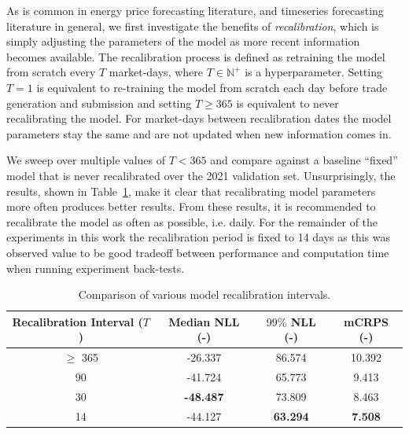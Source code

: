 As is common in energy price forecasting literature, and timeseries forecasting literature in general, we first
investigate the benefits of \textit{recalibration}, which is simply adjusting the parameters of the model as more
recent information becomes available.
The recalibration process is defined as retraining the model from scratch every $T$ market-days, where
$T \in \mathbb{N}^+$ is a hyperparameter.
Setting $T=1$ is equivalent to re-training the model from scratch each day before trade generation and submission and
setting $T \geq 365$ is equivalent to never recalibrating the model.
For market-days between recalibration dates the model parameters stay the same and are not updated when new information
comes in.

We sweep over multiple values of $T < 365$ and compare against a baseline ``fixed'' model that is never recalibrated
over the 2021 validation set.
Unsurprisingly, the results, shown in Table~\ref{tab:recalibration}, make it clear that recalibrating model parameters
more often produces better results.
From these results, it is recommended to recalibrate the model as often as possible, i.e. daily.
For the remainder of the experiments in this work the recalibration period is fixed to 14 days as this was observed
value to be good tradeoff between performance and computation time when running experiment back-tests.

\begin{table}[htb]
    \caption[Results of parameter recalibration]{
        Comparison of various model recalibration intervals.
    }
    \begin{center}
        \begin{tabular}{||c|c|c|c||} \hline
        Recalibration Interval ($T$) & Median NLL (-)  & $99\%$ NLL (-) & mCRPS (-)  \\	%
        \hline \hline
        $\geq$ 365  &         -26.337  &         86.574  &        10.392  \\ \hline
        90        &         -41.724  &         65.773  &         9.413  \\ \hline
        30        & \textbf{-48.487} &         73.809  &         8.463  \\ \hline
        14        &         -44.127  & \textbf{63.294} & \textbf{7.508} \\ \hline
        \end{tabular}
        \\ \rule{0mm}{5mm}
    \end{center}
    \label{tab:recalibration}
\end{table}

